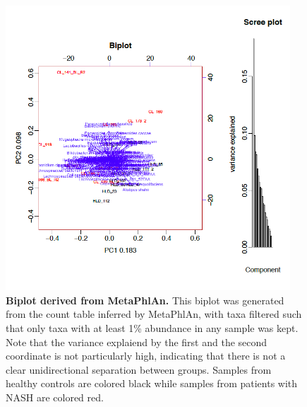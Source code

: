 \begin{figure}[h]
\begin{center}
\includegraphics[width=0.95\textwidth]{metaphlan_biplot.png}
\caption{\textbf{Biplot derived from MetaPhlAn.} This biplot was generated from the count table inferred by MetaPhlAn, with taxa filtered such that only taxa with at least 1\% abundance in any sample was kept. Note that the variance explaiend by the first and the second coordinate is not particularly high, indicating that there is not a clear unidirectional separation between groups. Samples from healthy controls are colored black while samples from patients with NASH are colored red.}
\end{center}
\label{nafld_metaphlan_biplot}
\end{figure}

